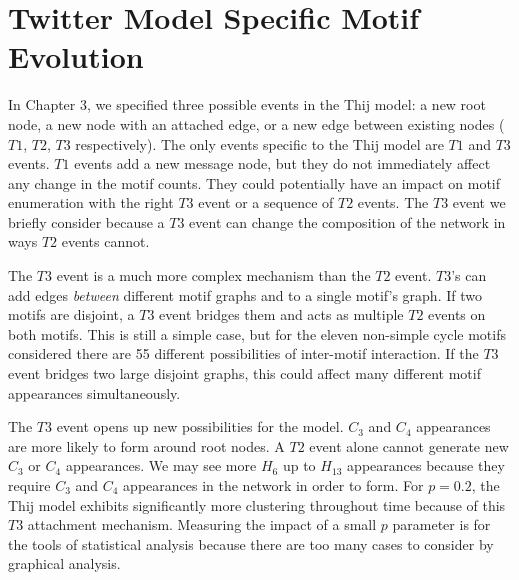 \section{Twitter Model Specific Motif Evolution}

In Chapter 3, we specified three possible
events in the Thij model: a new root node, a new node with an attached edge, or a new edge between existing nodes 
($T1$, $T2$, $T3$ respectively). The only events specific to the Thij model are $T1$ and $T3$ events. 
$T1$ events add a new message node, but they do not immediately affect any change in the motif counts.
They could potentially have an impact on motif enumeration with the right $T3$ event or a sequence of $T2$ events.
 The $T3$ event we briefly consider because a $T3$ event can change the composition of the network in ways $T2$ events cannot.

The $T3$ event is a much more complex mechanism than the $T2$ event. 
$T3$'s can add edges \textit{between} different motif graphs and to a single motif's graph. If two motifs
are disjoint, a $T3$ event bridges them and acts as multiple $T2$ events on both motifs. This is still a simple case,
 but for the eleven non-simple cycle motifs considered there are 55 different possibilities of inter-motif
 interaction. If the $T3$ event bridges two large disjoint graphs, this could affect many different motif appearances simultaneously. 

The $T3$ event opens up new possibilities for the model. $C_3$ and $C_4$ appearances
are more likely to form around root nodes. A $T2$ event alone cannot generate new $C_3$ or $C_4$ appearances. We may see more 
$H_{6}$ up to $H_{13}$ appearances because they require $C_3$ and $C_4$ appearances in the network in order to form.
 For $p=0.2$, the Thij model exhibits significantly more clustering throughout time because of this $T3$ attachment mechanism.
  Measuring the impact of a small $p$ parameter
  is for the tools of statistical analysis because there are too many cases to consider by graphical analysis. 



